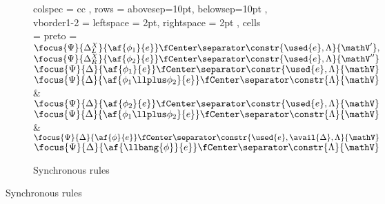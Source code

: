 \begin{figure}[h!]
	\ContinuedFloat
	\begin{subfigure}{\textwidth}
		\centering
		\begin{tblr}{ colspec = { cc } 
			    , rows = {abovesep=10pt, belowsep=10pt}
			    , vborder{1-2} = { leftspace = 2pt, rightspace = 2pt } 
			    , cells = { preto = {\footnotesize} }
			    }
			\AX$\focus{\Psi}{\Delta_L^X}{\af{\phi_1}{e}} \fCenter \separator \constr{\used{e}, \Lambda}{\mathV'},$
			\noLine
			\UI$\focus{\Psi}{\Delta_R^X}{\af{\phi_2}{e}} \fCenter \separator \constr{\used{e}, \Lambda}{\mathV''}$
			\LeftLabel{\derRule{\displayten}}
			\DP
			\\ 
			\AX$\focus{\Psi}{\Delta}{\af{\phi_1}{e}} \fCenter \separator \constr{\used{e}, \Lambda}{\mathV}$
			\LeftLabel{\derRule{\displayplus[L]}}
			\UI$\focus{\Psi}{\Delta}{\af{\phi_1 \llplus \phi_2}{e}} \fCenter \separator \constr{\Lambda}{\mathV}$
			\DP
			&
			\AX$\focus{\Psi}{\Delta}{\af{\phi_2}{e}} \fCenter \separator \constr{\used{e}, \Lambda}{\mathV}$
			\LeftLabel{\derRule{\displayplus[R]}}
			\UI$\focus{\Psi}{\Delta}{\af{\phi_1 \llplus \phi_2}{e}} \fCenter \separator \constr{\Lambda}{\mathV}$
			\DP
			\\
			\LeftLabel{\derRule{\displayone}}
			\DP
			&
			\AX$\focus{\Psi}{\Delta}{\af{\phi}{e}} \fCenter \separator \constr{\used{e}, \avail{\Delta}, \Lambda }{\mathV}$
			\LeftLabel{\derRule{\displaybang}}
			\UI$\focus{\Psi}{\Delta}{\af{\llbang{\phi}}{e}} \fCenter \separator \constr{\Lambda}{\mathV}$
			\DP
			\\
			\LeftLabel{\derRule{\displaytoasy}}
			\DP
		\end{tblr}
		\caption{Synchronous rules}
	\end{subfigure}
\end{figure}
